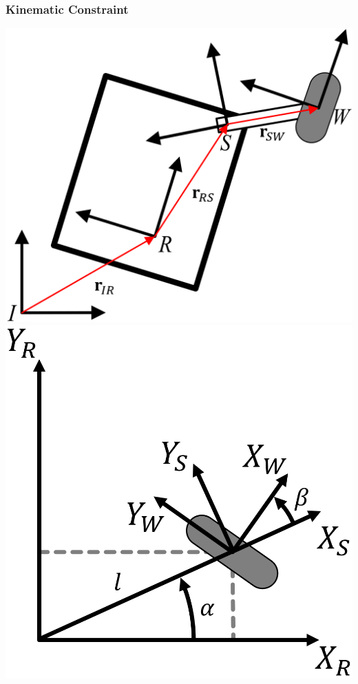 \subsubsection{Kinematic Constraint}
\includegraphics[width=\linewidth]{./Figures/03_WheelEquation.png}
\includegraphics[width=\linewidth]{./Figures/03_StandardWheel.png}
